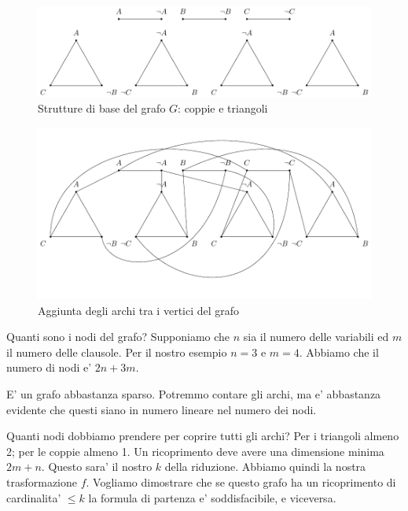 \begin{figure}[h]
    \begin{center}
        \includegraphics[scale=0.75]{./img/nondeterminism/SATtoVC1.pdf}
        \caption{Strutture di base del grafo $G$: coppie e triangoli}
        \label{img:SATtoVC1}
    \end{center}
\end{figure}

\begin{figure}[h]
    \begin{center}
        \includegraphics[scale=0.75]{./img/nondeterminism/SATtoVC2.pdf}
        \caption{Aggiunta degli archi tra i vertici del grafo}
        \label{img:SATtoVC2}
    \end{center}
\end{figure}

Quanti sono i nodi del grafo? Supponiamo che $n$ sia il numero delle variabili ed $m$ il numero
delle clausole. Per il nostro esempio $n=3$ e $m=4$. Abbiamo che il numero di nodi e' $2n + 3m$.

E' un grafo abbastanza sparso. Potremmo contare gli archi, ma e' abbastanza evidente che questi
siano in numero lineare nel numero dei nodi.

Quanti nodi dobbiamo prendere per coprire tutti gli archi? Per i triangoli almeno 2; per le coppie
almeno 1. Un ricoprimento deve avere una dimensione minima $2m + n$. Questo sara' il nostro $k$
della riduzione. Abbiamo quindi la nostra trasformazione $f$. Vogliamo dimostrare che se questo
grafo ha un ricoprimento di cardinalita' $\leq k$ la formula di partenza e' soddisfacibile, e
viceversa.

